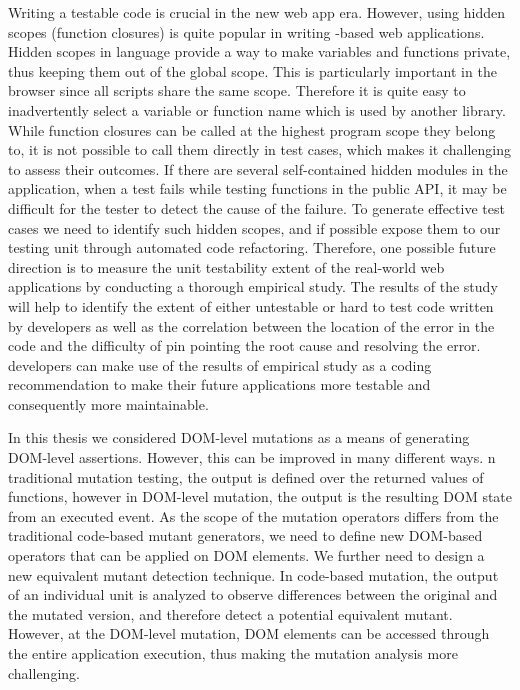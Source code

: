 Writing a testable code is crucial in the new web app era. However, using hidden scopes (\ie function closures) is quite popular in writing \javascript-based web applications. 
Hidden scopes in \javascript language provide a way to make variables and functions private, thus keeping them out of the global scope.
This is particularly important in the browser since all scripts share the same scope. Therefore it is quite easy to inadvertently select a variable or function name which is used by another library.
While function closures can be called at the highest program scope they belong to, it is not possible
to call them directly in test cases, which makes it challenging to assess their outcomes. 
If there are several self-contained hidden modules in the application, when a test fails while testing functions in the public API, it may be difficult for the tester to detect the cause of the failure.
To generate effective test cases we need to identify such hidden scopes, and if possible expose them to our testing unit through automated code refactoring. Therefore, one possible future direction is to measure the unit testability extent of the real-world \javascript web applications by conducting a thorough empirical study. The results of the study will help to identify the extent of either untestable or hard to test code written by developers as well as the correlation between the location of the error in the code and the difficulty of pin pointing the root cause and resolving the error. \javascript developers can make use of the results of empirical study as a coding recommendation to make their future applications more testable and consequently more maintainable. 

In this thesis we considered DOM-level mutations as a means of generating DOM-level assertions. However, this can be improved in many different ways. n traditional mutation testing, the output is defined over the returned values of functions, however in DOM-level mutation, the output is the resulting DOM state from an executed event. As the scope of the mutation operators differs from the traditional code-based mutant generators, we need to define new DOM-based operators that can be applied on DOM elements. We further need to design a new equivalent mutant detection technique. In code-based mutation, the output of an individual unit is analyzed to observe differences between the original and the mutated version, and therefore detect a potential equivalent mutant. However, at the DOM-level mutation, DOM elements can be accessed through the entire application execution, thus making the mutation analysis more challenging.

